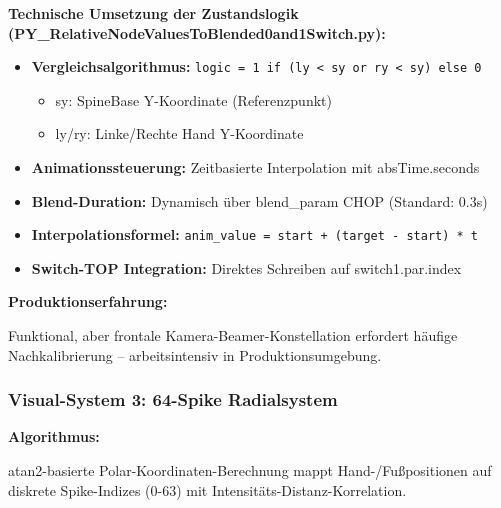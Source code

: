 \textbf{Technische Umsetzung der Zustandslogik (PY\_RelativeNodeValuesToBlended0and1Switch.py):}
\begin{itemize}
    \item \textbf{Vergleichsalgorithmus:} \texttt{logic = 1 if (ly < sy or ry < sy) else 0}
    \begin{itemize}
        \item sy: SpineBase Y-Koordinate (Referenzpunkt)
        \item ly/ry: Linke/Rechte Hand Y-Koordinate
    \end{itemize}
    \item \textbf{Animationssteuerung:} Zeitbasierte Interpolation mit absTime.seconds
    \item \textbf{Blend-Duration:} Dynamisch über blend\_param CHOP (Standard: 0.3s)
    \item \textbf{Interpolationsformel:} \texttt{anim\_value = start + (target - start) * t}
    \item \textbf{Switch-TOP Integration:} Direktes Schreiben auf switch1.par.index
\end{itemize}

\textbf{Produktionserfahrung:} \raggedright Funktional, aber frontale Kamera-Beamer-Konstellation erfordert häufige Nachkalibrierung – arbeitsintensiv in Produktionsumgebung.

\subsubsection{Visual-System 3: 64-Spike Radialsystem}


\textbf{Algorithmus:} \raggedright atan2-basierte Polar-Koordinaten-Berechnung mappt Hand-/Fußpositionen auf diskrete Spike-Indizes (0-63) mit Intensitäts-Distanz-Korrelation.

